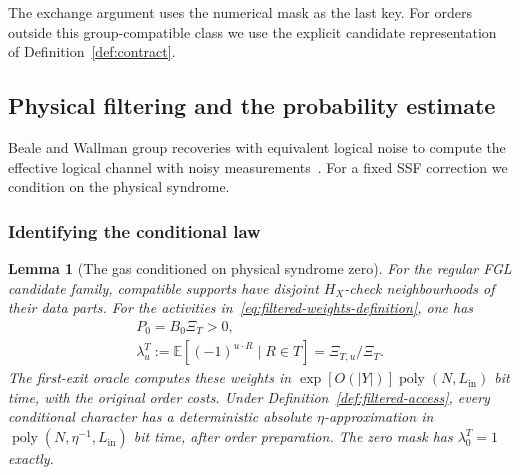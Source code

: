 \documentclass[10pt,twocolumn]{article}
\newtheorem{lemma}[theorem]{Lemma}
\theoremstyle{definition}
\DeclareMathOperator{\poly}{poly}
\newcommand{\Lin}{L_{\mathrm{in}}}
\begin{document}
The exchange argument uses the numerical mask as the last key. For
orders outside this group-compatible class we use the explicit
candidate representation of Definition~\ref{def:contract}.

\subsection{Physical filtering and the probability estimate}\label{app:probability-proofs}
Beale and Wallman group recoveries with equivalent logical noise to
compute the effective logical channel with noisy measurements~\cite{BW21}.
For a fixed SSF correction we condition on the physical syndrome.

\subsubsection{Identifying the conditional law}
\begin{lemma}[The gas conditioned on physical syndrome zero]\label{lem:conditioned-gas}
For the regular FGL candidate family, compatible supports have disjoint
$H_X$-check neighbourhoods of their data parts.
For the activities in~\eqref{eq:filtered-weights-definition}, one has
\begin{equation}\label{eq:conditioned-identities}
\begin{gathered}
 P_0=B_0\Xi_T>0,\\
 \lambda_u^T:=\mathbb E[(-1)^{u\cdot R}\mid R\in T]
                   =\Xi_{T,u}/\Xi_T.
\end{gathered}
\end{equation}
The first-exit oracle computes these weights in
$\exp[O(|Y|)]\poly(N,\Lin)$ bit time, with the original order costs.
Under Definition~\ref{def:filtered-access}, every conditional character
has a deterministic absolute $\eta$-approximation in
$\poly(N,\eta^{-1},\Lin)$ bit time, after order preparation.
The zero mask has $\lambda_0^T=1$ exactly.
\end{lemma}
\end{document}
